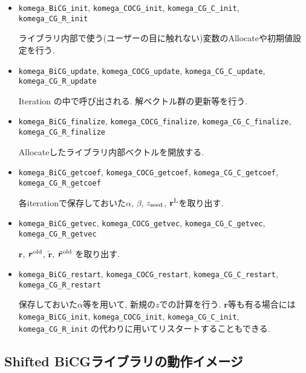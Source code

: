 \documentclass[12pt,titlepage]{jarticle}
\begin{document}
\begin{itemize}
\item \verb|komega_BiCG_init|, \verb|komega_COCG_init|, \verb|komega_CG_C_init|, \verb|komega_CG_R_init|

ライブラリ内部で使う(ユーザーの目に触れない)変数のAllocateや初期値設定を行う.

\item \verb|komega_BiCG_update|, \verb|komega_COCG_update|, \verb|komega_CG_C_update|, \verb|komega_CG_R_update|

Iteration の中で呼び出される. 解ベクトル群の更新等を行う.


\item \verb|komega_BiCG_finalize|, \verb|komega_COCG_finalize|, \verb|komega_CG_C_finalize|, \verb|komega_CG_R_finalize|

Allocateしたライブラリ内部ベクトルを開放する.

\item \verb|komega_BiCG_getcoef|, \verb|komega_COCG_getcoef|, \verb|komega_CG_C_getcoef|, \verb|komega_CG_R_getcoef|

各iterationで保存しておいた$\alpha$, $\beta$, $z_{\rm seed}$, ${\bf r}^{\rm L}$を取り出す.

\item \verb|komega_BiCG_getvec|, \verb|komega_COCG_getvec|, \verb|komega_CG_C_getvec|, \verb|komega_CG_R_getvec|

${\boldsymbol r}$, ${\boldsymbol r}^{\rm old}$, 
${\tilde {\boldsymbol r}}$, ${\tilde {\boldsymbol r}}^{\rm old}$
を取り出す.

\item \verb|komega_BiCG_restart|, \verb|komega_COCG_restart|, \verb|komega_CG_C_restart|, \verb|komega_CG_R_restart|

保存しておいた$\alpha$等を用いて, 新規の$z$での計算を行う.
${\boldsymbol r}$等も有る場合には
\verb|komega_BiCG_init|, \verb|komega_COCG_init|, \verb|komega_CG_C_init|, \verb|komega_CG_R_init|
の代わりに用いてリスタートすることもできる.

\end{itemize}

\subsection{Shifted BiCGライブラリの動作イメージ}%
\end{document}
